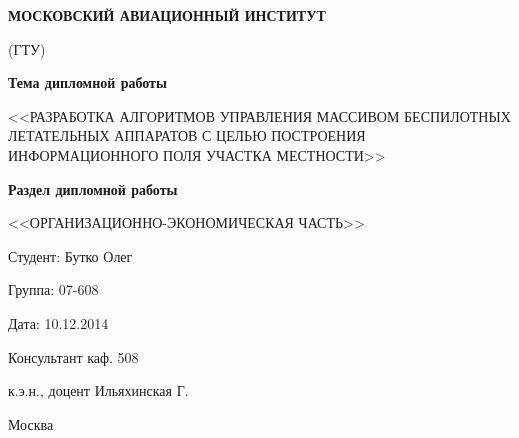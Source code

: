 \begin{titlepage}
\newpage

\begin{center}

    \textbf{МОСКОВСКИЙ АВИАЦИОННЫЙ ИНСТИТУТ}

    (ГТУ)

\end{center}

\vspace{\fill}

\begin{center}

    \textbf{Тема дипломной работы}

    <<РАЗРАБОТКА АЛГОРИТМОВ УПРАВЛЕНИЯ МАССИВОМ БЕСПИЛОТНЫХ
    ЛЕТАТЕЛЬНЫХ АППАРАТОВ С ЦЕЛЬЮ ПОСТРОЕНИЯ ИНФОРМАЦИОННОГО
    ПОЛЯ УЧАСТКА МЕСТНОСТИ>>

    \vspace{0.5em}

    \textbf{Раздел дипломной работы}

    <<ОРГАНИЗАЦИОННО-ЭКОНОМИЧЕСКАЯ ЧАСТЬ>>

\end{center}

\vspace{\fill}

\begin{flushright}
    Студент: Бутко Олег

    Группа: 07-608

    Дата: 10.12.2014

    Консультант каф. 508

    к.э.н., доцент Ильяхинская Г.

\end{flushright}

\vspace{\fill}

\begin{center}
    Москва
\end{center}

\end{titlepage}
